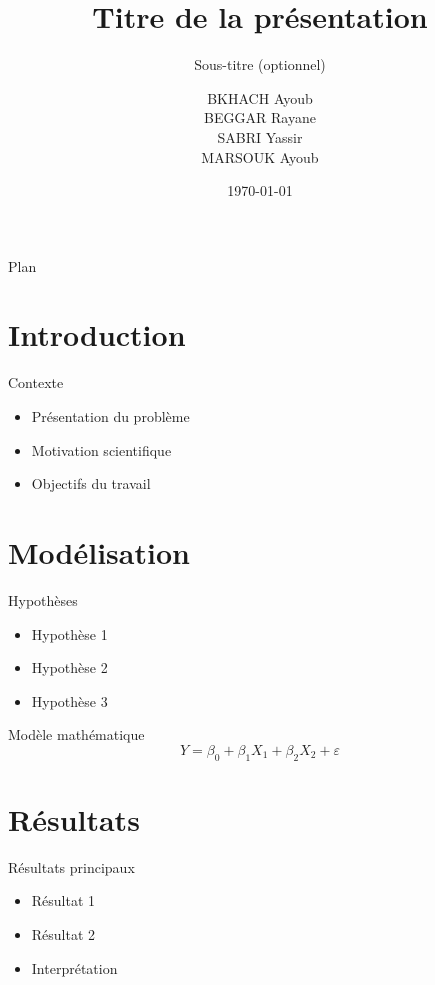 \documentclass[11pt]{beamer}
\title{Titre de la présentation}
\subtitle{Sous-titre (optionnel)}
\author[Équipe]{%
BKHACH Ayoub\\
BEGGAR Rayane\\
SABRI Yassir\\
MARSOUK Ayoub
}
\institute[ENSIMAG]{%
ENSIMAG\\[0.5em]
\textbf{Encadrant :} Christophe Dutang
}
\date{\today}
\begin{document}
\begin{frame}
  \titlepage
\end{frame}

\begin{frame}{Plan}
  \tableofcontents
\end{frame}

\section{Introduction}

\begin{frame}{Contexte}
\begin{itemize}
  \item Présentation du problème
  \item Motivation scientifique
  \item Objectifs du travail
\end{itemize}
\end{frame}

\section{Modélisation}

\begin{frame}{Hypothèses}
\begin{itemize}
  \item Hypothèse 1
  \item Hypothèse 2
  \item Hypothèse 3
\end{itemize}
\end{frame}

\begin{frame}{Modèle mathématique}
\[
Y = \beta_0 + \beta_1 X_1 + \beta_2 X_2 + \varepsilon
\]
\end{frame}

\section{Résultats}

\begin{frame}{Résultats principaux}
\begin{itemize}
  \item Résultat 1
  \item Résultat 2
  \item Interprétation
\end{itemize}
\end{frame}
\end{document}
